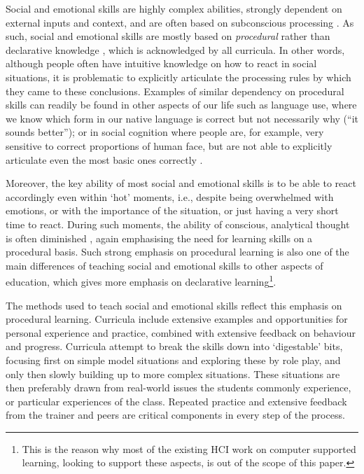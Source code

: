 \documentclass[prodmode,acmtochi]{acmsmall}
\newcommand{\GeraldineFIX}[1]{}
\begin{document}
Social and emotional skills are highly complex abilities, strongly dependent on external inputs and context, and are often based on subconscious processing \cite{Ambady2010,Lieberman2000}. As such, social and emotional skills are mostly based on \emph{procedural} rather than declarative knowledge \cite[p.288]{kruglanski2007social}, which is acknowledged by all curricula. In other words, although people often have intuitive knowledge on how to react in social situations, it is problematic to explicitly articulate the processing rules by which they came to these conclusions. Examples of similar dependency on procedural skills can readily be found  in other aspects of our life such as language use, where we know which form in our native language is correct but not necessarily why (``it sounds better''); or in social cognition where people are, for example,  very sensitive to correct proportions of human face, but are not able to explicitly articulate even the most basic ones correctly \cite{Lewicki1987}. 

Moreover, the key ability of most social and emotional skills is to be able to react accordingly even within `hot' moments, i.e., despite being overwhelmed with emotions, or with the importance of the situation, or just having a very short time to react. During such moments, the ability of conscious, analytical thought is often diminished \cite{Wyman2010,leDoux1998}, again emphasising the need for learning skills on a procedural basis.  Such strong emphasis on procedural learning is also one of the main differences of teaching social and emotional skills to other aspects of education, which gives more emphasis on declarative learning\footnote{This is  the reason why most of the existing HCI work on computer supported learning, looking to support these aspects, is out of the scope of this paper. \GeraldineFIX{G: make this a footnote as breaks flow?}}.


The methods used to teach social and emotional skills reflect this emphasis on procedural learning. Curricula include extensive examples and opportunities for personal experience and practice, combined with extensive feedback on behaviour and progress. Curricula attempt to break the skills down into `digestable' bits, focusing first on simple model situations and exploring these by role play, and only then slowly building up to more complex situations. These situations are then preferably drawn from real-world issues the students commonly experience, or particular experiences of the class. Repeated practice and extensive feedback from the trainer and peers are critical components in every step of the process.%
\end{document}
